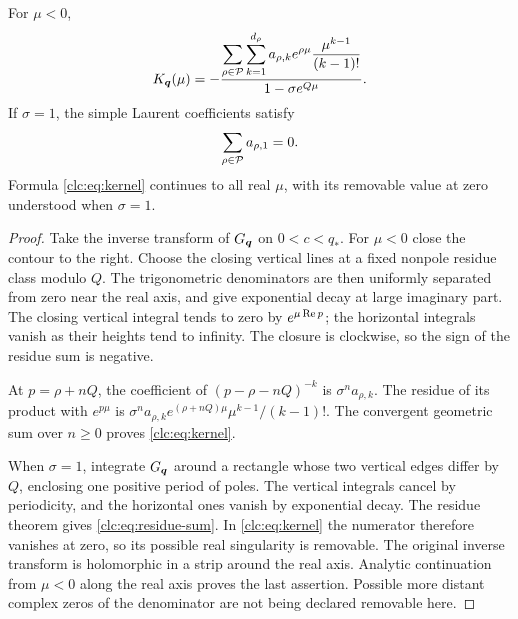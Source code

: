 \begin{lemma}\label{clc:lem:kernel}
For $\mu<0$,
\begin{equation}\label{clc:eq:kernel}
 K_{\boldsymbol q}(\mu)=
 -\frac{\displaystyle\sum_{\rho\in\mathcal P}\sum_{k=1}^{d_\rho}
 a_{\rho,k}e^{\rho\mu}\frac{\mu^{k-1}}{(k-1)!}}
 {1-\sigma e^{Q\mu}}.
\end{equation}
If $\sigma=1$, the simple Laurent coefficients satisfy
\begin{equation}\label{clc:eq:residue-sum}
 \sum_{\rho\in\mathcal P}a_{\rho,1}=0.
\end{equation}
Formula \eqref{clc:eq:kernel} continues to all real $\mu$, with its
removable value at zero understood when $\sigma=1$.
\end{lemma}
\begin{proof}
Take the inverse transform of $G_{\boldsymbol q}$ on $0<c<q_*$. For $\mu<0$ close
the contour to the right. Choose the closing vertical lines at a fixed
nonpole residue class modulo $Q$. The trigonometric denominators are
then uniformly separated from zero near the real axis, and give
exponential decay at large imaginary part. The closing vertical
integral tends to zero by $e^{\mu\operatorname{Re} p}$; the horizontal integrals
vanish as their heights tend to infinity. The closure is clockwise,
so the sign of the residue sum is negative.

At $p=\rho+nQ$, the coefficient of $(p-\rho-nQ)^{-k}$ is
$\sigma^n a_{\rho,k}$. The residue of its product with $e^{p\mu}$ is
$\sigma^na_{\rho,k}e^{(\rho+nQ)\mu}\mu^{k-1}/(k-1)!$.
The convergent geometric sum over $n\ge0$ proves
\eqref{clc:eq:kernel}.

When $\sigma=1$, integrate $G_{\boldsymbol q}$ around a rectangle whose two
vertical edges differ by $Q$, enclosing one positive period of poles.
The vertical integrals cancel by periodicity, and the horizontal ones
vanish by exponential decay. The residue theorem gives
\eqref{clc:eq:residue-sum}. In \eqref{clc:eq:kernel} the numerator
therefore vanishes at zero, so its possible real singularity is
removable. The original inverse transform is holomorphic in a strip
around the real axis. Analytic continuation from $\mu<0$ along the
real axis proves the last assertion. Possible more distant complex
zeros of the denominator are not being declared removable here.
\end{proof}

